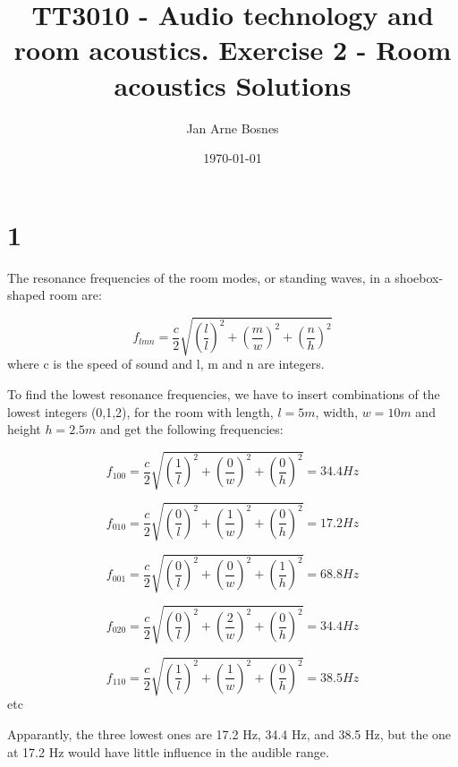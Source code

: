 \documentclass{article}
\title{TT3010 - Audio technology and room acoustics. \newline Exercise 2 - Room acoustics \newline Solutions}
\author{Jan Arne Bosnes}
\date{\today}
\begin{document}
\maketitle

\section*{1}

The resonance frequencies of the room modes, or standing waves, in a shoebox-shaped room are:

\begin{equation}
    f_{lmn} = \frac{c}{2}\sqrt{\left(\frac{l}{l}\right)^2+\left(\frac{m}{w}\right)^2+\left(\frac{n}{h}\right)^2}
\end{equation}
where c is the speed of sound and l, m and n are integers.

To find the lowest resonance frequencies, we have to insert combinations of the lowest integers (0,1,2), for the room with length, $l=5m$, width, $w=10m$ and height $h=2.5m$ and get the following frequencies:

\begin{equation}
    f_{100} = \frac{c}{2}\sqrt{\left(\frac{1}{l}\right)^2+\left(\frac{0}{w}\right)^2+\left(\frac{0}{h}\right)^2} = 34.4 Hz
\end{equation}

\begin{equation}
    f_{010} = \frac{c}{2}\sqrt{\left(\frac{0}{l}\right)^2+\left(\frac{1}{w}\right)^2+\left(\frac{0}{h}\right)^2} = 17.2 Hz
\end{equation}

\begin{equation}
    f_{001} = \frac{c}{2}\sqrt{\left(\frac{0}{l}\right)^2+\left(\frac{0}{w}\right)^2+\left(\frac{1}{h}\right)^2} = 68.8 Hz
\end{equation}

\begin{equation}
    f_{020} = \frac{c}{2}\sqrt{\left(\frac{0}{l}\right)^2+\left(\frac{2}{w}\right)^2+\left(\frac{0}{h}\right)^2} = 34.4 Hz
\end{equation}

\begin{equation}
    f_{110} = \frac{c}{2}\sqrt{\left(\frac{1}{l}\right)^2+\left(\frac{1}{w}\right)^2+\left(\frac{0}{h}\right)^2} = 38.5 Hz
\end{equation}
etc

Apparantly, the three lowest ones are 17.2 Hz, 34.4 Hz, and 38.5 Hz, but the one at 17.2 Hz would have little influence in the audible range.
\end{document}
